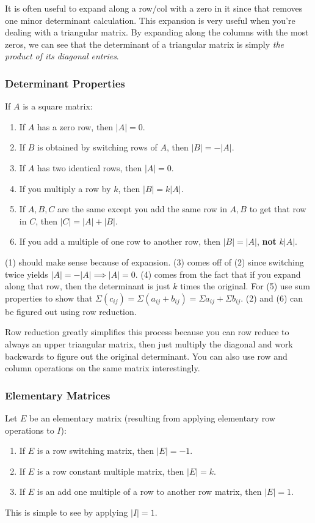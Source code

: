 \documentclass{article}
\begin{document}
It is often useful to expand along a row/col with a zero in it since that removes one minor determinant calculation. This expansion is very useful when you're dealing with a triangular matrix. By expanding along the columns with the most zeros, we can see that the determinant of a triangular matrix is simply \textit{the product of its diagonal entries}.

\subsubsection{Determinant Properties}
If $A$ is a square matrix:
\begin{enumerate}
    \item If $A$ has a zero row, then $|A| = 0$.
    \item If $B$ is obtained by switching rows of $A$, then $|B| = -|A|$.
    \item If $A$ has two identical rows, then $|A| = 0$.
    \item If you multiply a row by $k$, then $|B| = k|A|$.
    \item If $A, B, C$ are the same except you add the same row in $A, B$ to get that row in $C$, then $|C| = |A| + |B|$.
    \item If you add a multiple of one row to another row, then $|B| = |A|$, \textbf{not} $k|A|.$
\end{enumerate}
(1) should make sense because of expansion. (3) comes off of (2) since switching twice yields $|A| = -|A| \implies |A| = 0$. (4) comes from the fact that if you expand along that row, then the determinant is just $k$ times the original. For (5) use sum properties to show that $\Sigma (c_{ij}) = \Sigma (a_{ij} + b_{ij}) = \Sigma a_{ij} + \Sigma b_{ij}$. (2) and (6) can be figured out using row reduction.

Row reduction greatly simplifies this process because you can row reduce to always an upper triangular matrix, then just multiply the diagonal and work backwards to figure out the original determinant. You can also use row and column operations on the same matrix interestingly.

\subsubsection{Elementary Matrices}
Let $E$ be an elementary matrix (resulting from applying elementary row operations to $I$):
\begin{enumerate}
    \item If $E$ is a row switching matrix, then $|E| = -1$.
    \item If $E$ is a row constant multiple matrix, then $|E| = k$.
    \item If $E$ is an add one multiple of a row to another row matrix, then $|E| = 1$.
\end{enumerate}
This is simple to see by applying $|I| = 1$.
\end{document}
